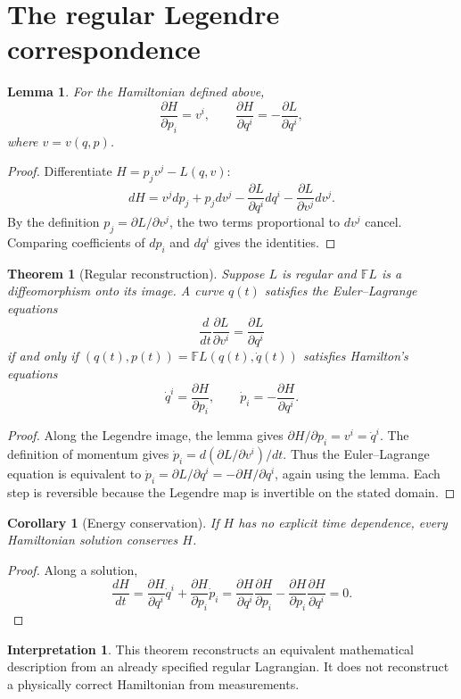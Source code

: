 \documentclass[12pt]{article}
\newtheorem{lemma}[definition]{Lemma}
\newtheorem{theorem}[definition]{Theorem}
\newtheorem{corollary}[definition]{Corollary}
\theoremstyle{definition}
\newtheorem{interpretation}[definition]{Interpretation}
\begin{document}
\section{The regular Legendre correspondence}
\begin{lemma}
For the Hamiltonian defined above,
\[
\frac{\partial H}{\partial p_i}=v^i,
\qquad
\frac{\partial H}{\partial q^i}=-\frac{\partial L}{\partial q^i},
\]
where $v=v(q,p)$.
\end{lemma}
\begin{proof}
Differentiate $H=p_jv^j-L(q,v)$:
\[
dH=v^jdp_j+p_jdv^j-\frac{\partial L}{\partial q^i}dq^i-
\frac{\partial L}{\partial v^j}dv^j.
\]
By the definition $p_j=\partial L/\partial v^j$, the two terms proportional to $dv^j$ cancel. Comparing coefficients of $dp_i$ and $dq^i$ gives the identities.
\end{proof}

\begin{theorem}[Regular reconstruction]
Suppose $L$ is regular and $\mathbb FL$ is a diffeomorphism onto its image. A curve $q(t)$ satisfies the Euler--Lagrange equations
\[
\frac{d}{dt}\frac{\partial L}{\partial v^i}=\frac{\partial L}{\partial q^i}
\]
if and only if $(q(t),p(t))=\mathbb FL(q(t),\dot q(t))$ satisfies Hamilton's equations
\[
\dot q^i=\frac{\partial H}{\partial p_i},\qquad
\dot p_i=-\frac{\partial H}{\partial q^i}.
\]
\end{theorem}
\begin{proof}
Along the Legendre image, the lemma gives $\partial H/\partial p_i=v^i=\dot q^i$. The definition of momentum gives $\dot p_i=d(\partial L/\partial v^i)/dt$. Thus the Euler--Lagrange equation is equivalent to $\dot p_i=\partial L/\partial q^i=-\partial H/\partial q^i$, again using the lemma. Each step is reversible because the Legendre map is invertible on the stated domain.
\end{proof}

\begin{corollary}[Energy conservation]
If $H$ has no explicit time dependence, every Hamiltonian solution conserves $H$.
\end{corollary}
\begin{proof}
Along a solution,
\[
\frac{dH}{dt}=\frac{\partial H}{\partial q^i}\dot q^i+
\frac{\partial H}{\partial p_i}\dot p_i
=\frac{\partial H}{\partial q^i}\frac{\partial H}{\partial p_i}-
\frac{\partial H}{\partial p_i}\frac{\partial H}{\partial q^i}=0.
\]
\end{proof}

\begin{interpretation}
This theorem reconstructs an equivalent mathematical description from an already specified regular Lagrangian. It does not reconstruct a physically correct Hamiltonian from measurements.
\end{interpretation}
\end{document}
